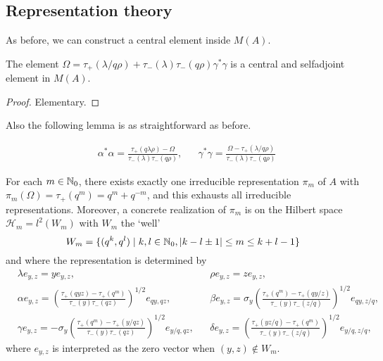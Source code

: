 \subsection{Representation theory}

As before, we can construct a central element inside $M(A)$.

\begin{Lem} The element $\Omega = \tau_+(\lambda/q\rho)+\tau_-(\lambda)\tau_-(q\rho)\gamma^*\gamma$ is a central and selfadjoint element in $M(A)$.
\end{Lem}
\begin{proof} Elementary.
\end{proof}

Also the following lemma is as straightforward as before.

\begin{Lem}\label{LemOm}  \begin{align*}  & \alpha^*\alpha = \frac{\tau_+(q\lambda\rho)-\Omega}{\tau_-(\lambda)\tau_-(q\rho)}, && \gamma^*\gamma = \frac{\Omega - \tau_+(\lambda/q\rho)}{\tau_-(\lambda)\tau_-(q\rho)} 
\end{align*}
\end{Lem} 

\begin{Lem} For each $m\in \mathbb{N}_0$, there exists exactly one irreducible representation $\pi_m$ of $A$ with $\pi_m(\Omega) = \tau_+(q^m) = q^m+q^{-m}$, and this exhausts all irreducible representations. Moreover, a concrete realization of $\pi_m$ is on the Hilbert space $\mathscr{H}_m = l^2(W_{m})$ with $W_m$ the `well' \[W_m = \{(q^k,q^l)\mid k,l\in \mathbb{N}_0, |k-l\pm1|\leq m \leq k+l-1\}\] and where the representation is determined by \begin{align*} & \lambda e_{y,z} = ye_{y,z},&& \rho e_{y,z} = z e_{y,z},\\
&\alpha e_{y,z} = \left(\frac{\tau_+(qyz)-\tau_+(q^m)}{\tau_-(y)\tau_-(qz)}\right)^{1/2} e_{qy,qz}, &&\beta e_{y,z} = \sigma_y \left(\frac{\tau_+(q^m)-\tau_+(qy/z)}{\tau_-(y)\tau_-(z/q)}\right)^{1/2}e_{qy,z/q}, \\
&\gamma e_{y,z} = -\sigma_y \left(\frac{\tau_+(q^m)-\tau_+(y/qz)}{\tau_-(y)\tau_-(qz)}\right)^{1/2} e_{y/q,qz}, && \delta e_{y,z} = \left(\frac{\tau_+(yz/q)-\tau_+(q^m)}{\tau_-(y)\tau_-(z/q)}\right)^{1/2} e_{y/q,z/q},\end{align*}
where $e_{y,z}$ is interpreted as the zero vector when $(y,z)\notin W_m$. 
\end{Lem} 

